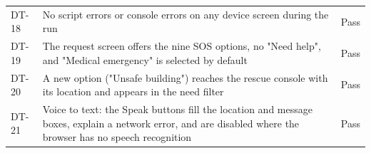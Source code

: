\begin{table}[!htbp]
\begin{tabularx}{\textwidth}{@{}p{1.0cm}X p{1.3cm}@{}}
DT-18 & No script errors or console errors on any device screen during the run & Pass \\
DT-19 & The request screen offers the nine SOS options, no "Need help", and "Medical emergency" is selected by default & Pass \\
DT-20 & A new option ("Unsafe building") reaches the rescue console with its location and appears in the need filter & Pass \\
DT-21 & Voice to text: the Speak buttons fill the location and message boxes, explain a network error, and are disabled where the browser has no speech recognition & Pass \\
\bottomrule
\end{tabularx}
\end{table}
